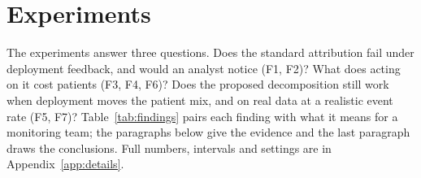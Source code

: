 \documentclass[letterpaper]{article} %
\begin{document}
\begin{table}[t]
\centering\scriptsize
\setlength{\tabcolsep}{3pt}
\caption{Identification by design, checked against Experiment F and the
site-rollout experiment (Table~\ref{tab:sites}, Appendix~\ref{app:sites}). ``$X$ split'': deployment-caused
against exogenous covariate shift. Under random rollout order the
retrospective bias is $-0.2\%$ and $-0.7\%$; with rollout linked to a site
characteristic that also sets baseline risk it is $-10.5\%$ under common
covariate trends: parallel trends must hold for the loss, not only for the
covariates$^\dagger$. $^\ddagger$Each design is assessed alone; a randomised
unalerted arm nested within the wedge adds the prospective contrast.}
\label{tab:identification}
\end{table}

\section{Experiments}
\label{sec:sim}

The experiments answer three questions. Does the standard attribution fail
under deployment feedback, and would an analyst notice (F1, F2)? What does
acting on it cost patients (F3, F4, F6)? Does the proposed decomposition still
work when deployment moves the patient mix, and on real data at a realistic
event rate (F5, F7)? Table~\ref{tab:findings} pairs each finding with what it
means for a monitoring team; the paragraphs below give the evidence and the
last paragraph draws the conclusions. Full numbers, intervals and settings are
in Appendix~\ref{app:details}.
\end{document}
